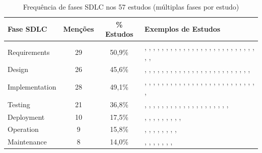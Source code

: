 \begin{table}[htbp]
\centering
\caption{Frequência de fases SDLC nos 57 estudos (múltiplas fases por estudo)}
\label{tab:sdlc}
\scriptsize
\begin{tabular}{lccp{6.5cm}}
\hline
\textbf{Fase SDLC} & \textbf{Menções} & \textbf{\% Estudos} & \textbf{Exemplos de Estudos} \\
\hline
Requirements                   & 29 & 50,9\% & \cite{S001}, \cite{S002}, \cite{S004}, \cite{S005}, \cite{S006}, \cite{S007}, \cite{S011}, \cite{S012}, \cite{S013}, \cite{S014}, \cite{S023}, \cite{S024}, \cite{S025}, \cite{S028}, \cite{S031}, \cite{S035}, \cite{S037}, \cite{S038}, \cite{S039}, \cite{S042}, \cite{S043}, \cite{S044}, \cite{S045}, \cite{S046}, \cite{S047}, \cite{S050}, \cite{S055}, \cite{S056}, \cite{S058} \\
\hline
Design                         & 26 & 45,6\% & \cite{S001}, \cite{S004}, \cite{S005}, \cite{S006}, \cite{S007}, \cite{S008}, \cite{S009}, \cite{S011}, \cite{S012}, \cite{S013}, \cite{S014}, \cite{S017}, \cite{S025}, \cite{S027}, \cite{S031}, \cite{S033}, \cite{S037}, \cite{S038}, \cite{S039}, \cite{S041}, \cite{S043}, \cite{S046}, \cite{S049}, \cite{S050}, \cite{S053}, \cite{S055} \\
\hline
Implementation                 & 28 & 49,1\% & \cite{S001}, \cite{S005}, \cite{S008}, \cite{S009}, \cite{S010}, \cite{S011}, \cite{S012}, \cite{S013}, \cite{S014}, \cite{S015}, \cite{S021}, \cite{S022}, \cite{S025}, \cite{S026}, \cite{S028}, \cite{S033}, \cite{S034}, \cite{S035}, \cite{S036}, \cite{S037}, \cite{S038}, \cite{S039}, \cite{S041}, \cite{S042}, \cite{S046}, \cite{S050}, \cite{S053}, \cite{S055} \\
\hline
Testing                        & 21 & 36,8\% & \cite{S001}, \cite{S003}, \cite{S004}, \cite{S005}, \cite{S008}, \cite{S010}, \cite{S013}, \cite{S014}, \cite{S015}, \cite{S021}, \cite{S022}, \cite{S026}, \cite{S027}, \cite{S034}, \cite{S036}, \cite{S039}, \cite{S045}, \cite{S046}, \cite{S050}, \cite{S052}, \cite{S055} \\
\hline
Deployment                     & 10 & 17,5\% & \cite{S001}, \cite{S003}, \cite{S009}, \cite{S013}, \cite{S014}, \cite{S017}, \cite{S026}, \cite{S038}, \cite{S041}, \cite{S046} \\
\hline
Operation                      &  9 & 15,8\% & \cite{S001}, \cite{S003}, \cite{S005}, \cite{S013}, \cite{S014}, \cite{S027}, \cite{S038}, \cite{S041}, \cite{S045} \\
\hline
Maintenance                    &  8 & 14,0\% & \cite{S001}, \cite{S009}, \cite{S013}, \cite{S014}, \cite{S030}, \cite{S038}, \cite{S041}, \cite{S046} \\

\end{tabular}
\end{table}
